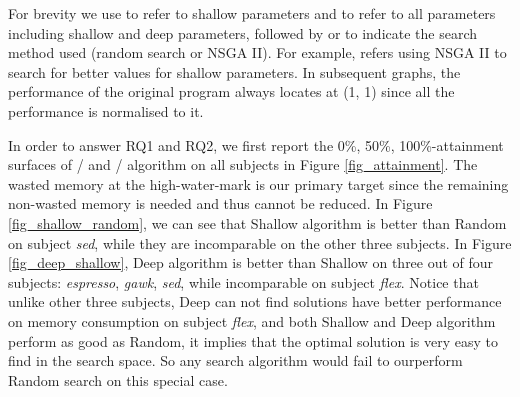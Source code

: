 For brevity we use \emph{\shallow} to refer to shallow parameters and \emph{\all} to refer to all parameters including shallow and deep parameters, followed by \emph{\randomsearch} or \emph{\nsgaii} to indicate the search method used (random search or NSGA II). For example, \sn{} refers using NSGA II to search for better values for shallow parameters.
In subsequent graphs, the performance of the original program always locates at (1, 1) since all the performance is normalised to it.

\begin{figure*}[htb]
	\centering
	\subfigure[espresso]{
		\label{fig_attainment_espresso}
		\texttt{[image: espresso\_attainment]}%
	}
	\subfigure[gawk]{
		\label{fig_attainment_gawk}
		\texttt{[image: gawk\_attainment]}%
	}
	\subfigure[flex]{
		\label{fig_attainment_flex}
		\texttt{[image: flex\_attainment]}%
	}
	\subfigure[sed]{
		\label{fig_attainment_sed}
		\texttt{[image: espresso\_attainment]}%
	}
	\caption{0\%, 50\%, 100\%-attainment surfaces of the results of \sr{}, \sn{}, \dr{}, \dn{} over 20 runs for each application.}\label{fig_attainment}
\end{figure*}

In order to answer RQ1 and RQ2, we first report the 0\%, 50\%, 100\%-attainment surfaces of \sr{}/\sn{} and \sn{}/\dn{} algorithm on all subjects in Figure \ref{fig_attainment}. The wasted memory at the high-water-mark is our primary target since the remaining non-wasted memory is needed and thus cannot be reduced. In Figure \ref{fig_shallow_random}, we can see that Shallow algorithm is better than Random on subject \emph{sed}, while they are incomparable on the other three subjects. In Figure \ref{fig_deep_shallow}, Deep algorithm is better than Shallow on three out of four subjects: \emph{espresso}, \emph{gawk}, \emph{sed}, while incomparable on subject \emph{flex}. Notice that unlike other three subjects, Deep can not find solutions have better performance on memory consumption on subject \emph{flex}, and both Shallow and Deep algorithm perform as good as Random, it implies that the optimal solution is very easy to find in the search space. So any search algorithm would fail to ourperform Random search on this special case.

